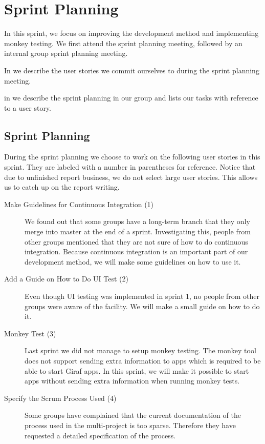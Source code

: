 \chapter{Sprint Planning}\label{chap:s3_sprintplanning}
In this sprint, we focus on improving the development method and implementing monkey testing. We first attend the \bd sprint planning meeting, followed by an internal group sprint planning meeting.

\begin{chapterorganization}
  \item In  we describe the user stories we commit ourselves to during the \bd sprint planning meeting.
  \item in  we describe the sprint planning in our group and lists our tasks with reference to a user story.
\end{chapterorganization}

\section{\bdtitle Sprint Planning}\label{sec:S3_bd}
During the \bd sprint planning we choose to work on the following user stories in this sprint. They are labeled with a number in parentheses for reference. Notice that due to unfinished report business, we do not select large user stories. This allows us to catch up on the report writing.

\begin{description}
  \item[Make Guidelines for Continuous Integration (1)] We found out that some groups have a long-term branch that they only merge into master at the end of a sprint. Investigating this, people from other groups mentioned that they are not sure of how to do continuous integration. Because continuous integration is an important part of our development method, we will make some guidelines on how to use it.
  \item[Add a Guide on How to Do UI Test (2)] Even though UI testing was implemented in sprint 1, no people from other groups were aware of the facility. We will make a small guide on how to do it.
  \item[Monkey Test (3)] Last sprint we did not manage to setup monkey testing. The monkey tool does not support sending extra information to apps which is required to be able to start Giraf apps. In this sprint, we will make it possible to start apps without sending extra information when running monkey tests.
  \item[Specify the Scrum Process Used (4)] Some groups have complained that the current documentation of the process used in the multi-project is too sparse. Therefore they have requested a detailed specification of the process.
\end{description}

